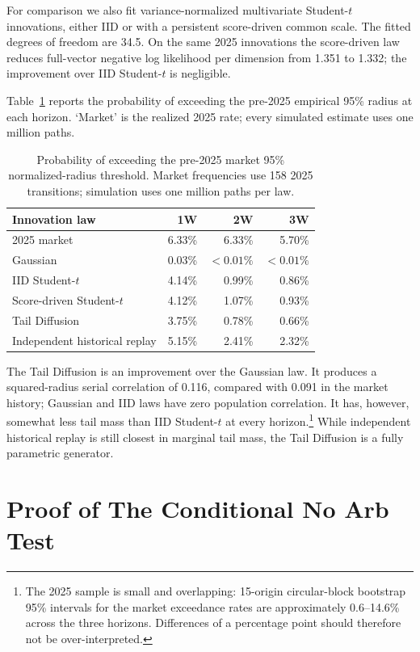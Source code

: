 \documentclass[11pt,a4paper]{article}
\begin{document}
For comparison we also fit variance-normalized multivariate Student-$t$
innovations, either IID or with a persistent score-driven common scale.  The
fitted degrees of freedom are 34.5.  On the same 2025 innovations the
score-driven law reduces full-vector negative log likelihood per dimension
from 1.351 to 1.332; the improvement over IID Student-$t$ is negligible.

Table~\ref{tab:tails} reports the probability of exceeding the pre-2025
empirical 95\% radius at each horizon.  `Market' is the realized 2025 rate;
every simulated estimate uses one million paths.

\begin{table}[H]
\centering
\small
\begin{tabular}{lrrr}
\toprule
Innovation law & 1W & 2W & 3W\\
\midrule
2025 market & 6.33\% & 6.33\% & 5.70\%\\
Gaussian & 0.03\% & $<0.01\%$ & $<0.01\%$\\
IID Student-$t$ & 4.14\% & 0.99\% & 0.86\%\\
Score-driven Student-$t$ & 4.12\% & 1.07\% & 0.93\%\\
Tail Diffusion & 3.75\% & 0.78\% & 0.66\%\\
Independent historical replay & 5.15\% & 2.41\% & 2.32\%\\
\bottomrule
\end{tabular}
\caption{Probability of exceeding the pre-2025 market 95\% normalized-radius
threshold.  Market frequencies use 158 2025 transitions; simulation uses one
million paths per law.}
\label{tab:tails}
\end{table}

The Tail Diffusion is an improvement over the Gaussian law.
 It produces a squared-radius serial correlation of 0.116,
compared with 0.091 in the market history; Gaussian and IID laws have zero
population correlation. It has, however, somewhat less tail mass than IID Student-$t$ at every horizon.\footnote{The 2025
sample is small and overlapping: 15-origin circular-block bootstrap 95\%
intervals for the market exceedance rates are approximately 0.6--14.6\%
across the three horizons.  Differences of a percentage point
should therefore not be over-interpreted.  } While independent historical replay is
still closest in marginal tail mass, the Tail Diffusion is a fully
parametric generator.

\section{Proof of The Conditional No Arb Test}
\label{sec:proof-cond-no-arb}
\end{document}
